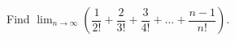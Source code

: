 Find $\displaystyle\lim_{n\to\infty}\left(\dfrac{1}{2!}+\dfrac{2}{3!}+\dfrac{3}{4!}+\dots+\dfrac{n-1}{n!}\right)$.
